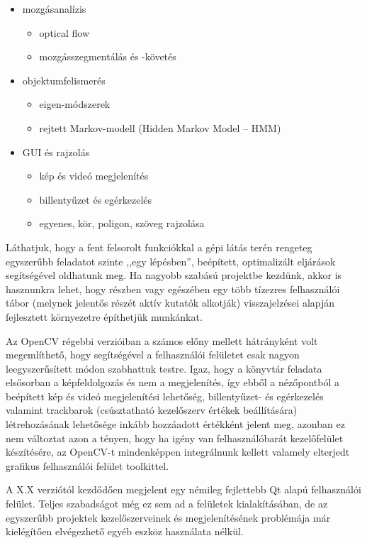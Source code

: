 \begin{itemize}
 \item mozgásanalízis
  \begin{itemize}
   \item optical flow
   \item mozgásszegmentálás és -követés
  \end{itemize}

 \item objektumfelismerés
  \begin{itemize}
   \item eigen-módszerek
   \item rejtett Markov-modell (Hidden Markov Model -- HMM)
  \end{itemize}
  
 \item GUI és rajzolás
  \begin{itemize}
   \item kép és videó megjelenítés
   \item billentyűzet és egérkezelés
   \item egyenes, kör, poligon, szöveg rajzolása
  \end{itemize}
  
\end{itemize}

Láthatjuk, hogy a fent felsorolt funkciókkal a gépi látás terén rengeteg egyszerűbb feladatot szinte ,,egy lépésben'', beépített, optimalizált eljárások segítségével oldhatunk meg. Ha nagyobb szabású projektbe kezdünk, akkor is hasznunkra lehet, hogy részben vagy egészében egy több tízezres felhasználói tábor (melynek jelentős részét aktív kutatók alkotják) visszajelzései alapján fejlesztett környezetre építhetjük munkánkat.

Az OpenCV régebbi verzióiban a számos előny mellett hátrányként volt megemlíthető, hogy segítségével a felhasználói felületet csak nagyon leegyszerűsített módon szabhattuk testre. Igaz, hogy a könyvtár feladata elsősorban a képfeldolgozás és nem a megjelenítés, így ebből a nézőpontból a beépített kép és videó megjelenítési lehetőség, billentyűzet- és egérkezelés valamint trackbarok (csúsztatható kezelőszerv értékek beállítására) létrehozásának lehetősége inkább hozzáadott értékként jelent meg, azonban ez nem változtat azon a tényen, hogy ha igény van felhasználóbarát kezelőfelület készítésére, az OpenCV-t mindenképpen integrálnunk kellett valamely elterjedt grafikus felhasználói felület toolkittel.

\bigskip

A X.X verziótól kezdődően megjelent egy némileg fejlettebb Qt alapú felhasználói felület. Teljes szabadságot még ez sem ad a felületek kialakításában, de az egyszerűbb projektek kezelőszerveinek és megjelenítésének problémája már kielégítően elvégezhető egyéb eszköz használata nélkül.

